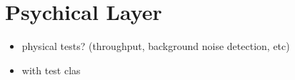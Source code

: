\section{Psychical Layer}

\begin{itemize}
\item physical tests? (throughput, background noise detection, etc)
\item with test clas
\end{itemize}
